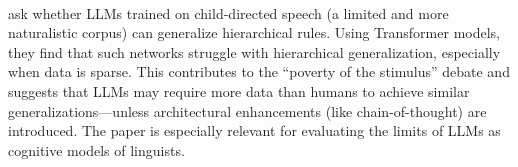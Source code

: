 \paragraph{} \citet{yedetore2023stimulus} ask whether LLMs trained on child-directed speech (a limited and more naturalistic corpus) can generalize hierarchical rules. Using Transformer models, they find that such networks struggle with hierarchical generalization, especially when data is sparse. This contributes to the ``poverty of the stimulus'' debate and suggests that LLMs may require more data than humans to achieve similar generalizations---unless architectural enhancements (like chain-of-thought) are introduced. The paper is especially relevant for evaluating the limits of LLMs as cognitive models of linguists.
